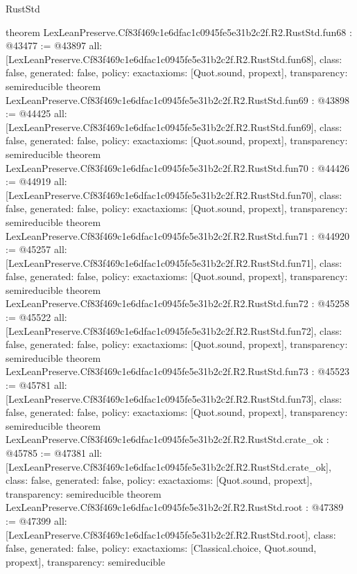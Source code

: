 \begin{lexlean}{RustStd}
\begin{coremodule}
{}
theorem LexLeanPreserve.Cf83f469c1e6dfac1c0945fe5e31b2c2f.R2.RustStd.fun68 : @43477 := @43897 {
  all: [LexLeanPreserve.Cf83f469c1e6dfac1c0945fe5e31b2c2f.R2.RustStd.fun68],
  class: false,
  generated: false,
  policy: exact{axioms: [Quot.sound, propext]},
  transparency: semireducible
}
theorem LexLeanPreserve.Cf83f469c1e6dfac1c0945fe5e31b2c2f.R2.RustStd.fun69 : @43898 := @44425 {
  all: [LexLeanPreserve.Cf83f469c1e6dfac1c0945fe5e31b2c2f.R2.RustStd.fun69],
  class: false,
  generated: false,
  policy: exact{axioms: [Quot.sound, propext]},
  transparency: semireducible
}
theorem LexLeanPreserve.Cf83f469c1e6dfac1c0945fe5e31b2c2f.R2.RustStd.fun70 : @44426 := @44919 {
  all: [LexLeanPreserve.Cf83f469c1e6dfac1c0945fe5e31b2c2f.R2.RustStd.fun70],
  class: false,
  generated: false,
  policy: exact{axioms: [Quot.sound, propext]},
  transparency: semireducible
}
theorem LexLeanPreserve.Cf83f469c1e6dfac1c0945fe5e31b2c2f.R2.RustStd.fun71 : @44920 := @45257 {
  all: [LexLeanPreserve.Cf83f469c1e6dfac1c0945fe5e31b2c2f.R2.RustStd.fun71],
  class: false,
  generated: false,
  policy: exact{axioms: [Quot.sound, propext]},
  transparency: semireducible
}
theorem LexLeanPreserve.Cf83f469c1e6dfac1c0945fe5e31b2c2f.R2.RustStd.fun72 : @45258 := @45522 {
  all: [LexLeanPreserve.Cf83f469c1e6dfac1c0945fe5e31b2c2f.R2.RustStd.fun72],
  class: false,
  generated: false,
  policy: exact{axioms: [Quot.sound, propext]},
  transparency: semireducible
}
theorem LexLeanPreserve.Cf83f469c1e6dfac1c0945fe5e31b2c2f.R2.RustStd.fun73 : @45523 := @45781 {
  all: [LexLeanPreserve.Cf83f469c1e6dfac1c0945fe5e31b2c2f.R2.RustStd.fun73],
  class: false,
  generated: false,
  policy: exact{axioms: [Quot.sound, propext]},
  transparency: semireducible
}
theorem LexLeanPreserve.Cf83f469c1e6dfac1c0945fe5e31b2c2f.R2.RustStd.crate_ok : @45785 := @47381 {
  all: [LexLeanPreserve.Cf83f469c1e6dfac1c0945fe5e31b2c2f.R2.RustStd.crate_ok],
  class: false,
  generated: false,
  policy: exact{axioms: [Quot.sound, propext]},
  transparency: semireducible
}
theorem LexLeanPreserve.Cf83f469c1e6dfac1c0945fe5e31b2c2f.R2.RustStd.root : @47389 := @47399 {
  all: [LexLeanPreserve.Cf83f469c1e6dfac1c0945fe5e31b2c2f.R2.RustStd.root],
  class: false,
  generated: false,
  policy: exact{axioms: [Classical.choice, Quot.sound, propext]},
  transparency: semireducible
}


\end{coremodule}
\end{lexlean}
